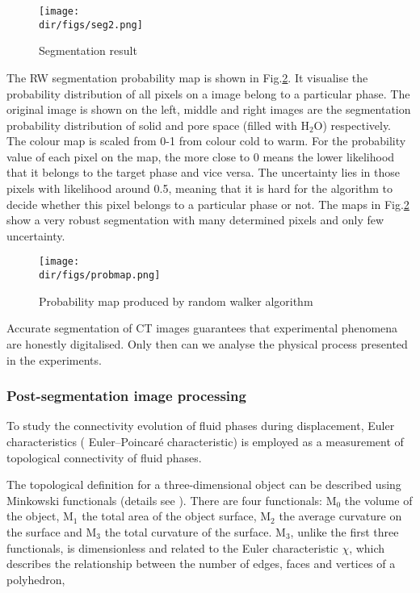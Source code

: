 \begin{figure}[htbp]
  \centering
  \texttt{[image: \\dir/figs/seg2.png]}
  \caption{Segmentation result}
  \label{seg2}
\end{figure}

The RW segmentation probability map is shown in Fig.\ref{probmap}. It visualise the probability distribution of all pixels on a image belong to a particular phase. The original image is shown on the left, middle and right images are the segmentation probability distribution of solid and pore space (filled with H$_2$O) respectively.
The colour map is scaled from 0-1 from colour cold to warm. For the probability value of each pixel on the map, the more close to 0 means the lower likelihood that it belongs to the target phase and vice versa. The uncertainty lies in those pixels with likelihood around 0.5, meaning that it is hard for the algorithm to decide whether this pixel belongs to a particular phase or not. The maps in Fig.\ref{probmap} show a very robust segmentation with many determined pixels and only few uncertainty.

\begin{figure}[htbp]
  \centering
  \texttt{[image: \\dir/figs/probmap.png]}
  \caption{Probability map produced by random walker algorithm}
  \label{probmap}
\end{figure}

Accurate segmentation of CT images guarantees that experimental phenomena are honestly digitalised. Only then can we analyse the physical process presented in the experiments. 

\subsubsection{Post-segmentation image processing}

To study the connectivity evolution of fluid phases during displacement, Euler characteristics ( Euler--Poincar\'e characteristic) is employed as a measurement of topological connectivity of fluid phases. 

The topological definition for a three-dimensional object can be described using Minkowski functionals (details see \cite{blunt2017multiphase,mecke2005fluids}). There are four functionals: M$_0$ the volume of the object, M$_1$ the total area of the object surface, M$_2$ the average curvature on the surface and M$_3$ the total curvature of the surface. M$_3$, unlike the first three functionals, is dimensionless and related to the Euler characteristic $\chi$, which describes the relationship between the number of edges, faces and vertices of a polyhedron,

